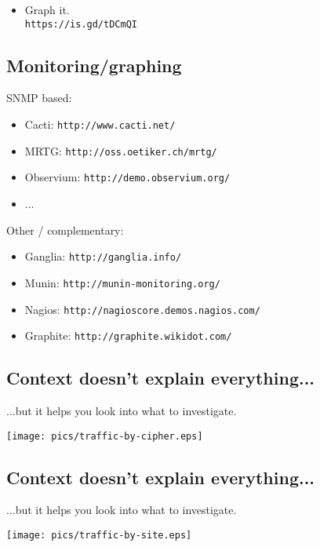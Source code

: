 \documentclass[xga]{xdvislides}
\begin{document}
\addvspace{.5in}
\begin{itemize}
	\item Graph it. \\
	{\tt https://is.gd/tDCmQI}
\end{itemize}

\subsection{Monitoring/graphing}
SNMP based:
\begin{itemize}
	\item Cacti: \verb+http://www.cacti.net/+
	\item MRTG: \verb+http://oss.oetiker.ch/mrtg/+
	\item Observium: \verb+http://demo.observium.org/+
	\item ...
\end{itemize}
\vspace{.2in}
Other / complementary:
\begin{itemize}
	\item Ganglia: \verb+http://ganglia.info/+
	\item Munin: \verb+http://munin-monitoring.org/+
	\item Nagios: \verb+http://nagioscore.demos.nagios.com/+
	\item Graphite: \verb+http://graphite.wikidot.com/+
\end{itemize}
\vspace{.5in}

\subsection{Context doesn't explain everything...}
...but it helps you look into what to investigate.

\begin{center}
	\texttt{[image: pics/traffic-by-cipher.eps]}
\end{center}

\subsection{Context doesn't explain everything...}
...but it helps you look into what to investigate.

\begin{center}
	\texttt{[image: pics/traffic-by-site.eps]}
\end{center}
\end{document}

